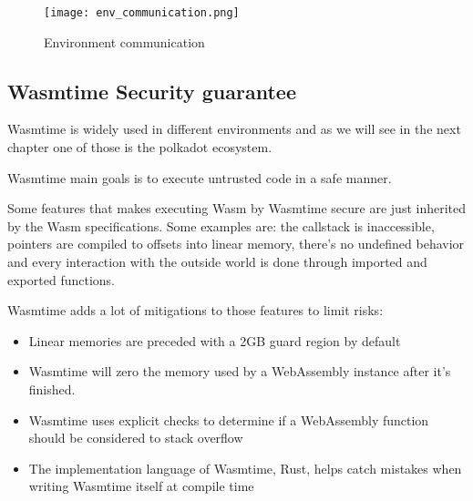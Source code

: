 \begin{figure}[h]
  \centering
  \texttt{[image: env\_communication.png]}
  \caption{Environment communication}
  \label{fig:env-communication}
\end{figure}

\subsection{Wasmtime Security guarantee}

Wasmtime is widely used in different environments and as we will see in the next chapter one of those is the polkadot ecosystem.

Wasmtime main goals is to execute untrusted code in a safe manner.~\cite{wasmtime-book}

Some features that makes executing Wasm by Wasmtime secure are just inherited by the Wasm specifications. Some examples are: the callstack is inaccessible, pointers are compiled to offsets into linear memory, there's no undefined behavior and every interaction with the outside world is done through imported and exported functions.~\cite{wasmtime-book}

Wasmtime adds  a lot of mitigations to those features to limit risks:
\begin{itemize}
  \item Linear memories are preceded with a 2GB guard region  by default
  \item Wasmtime will zero the memory used by a WebAssembly instance after it's finished.
  \item Wasmtime uses explicit checks to determine if a WebAssembly function should be considered to stack overflow
  \item The implementation language of Wasmtime, Rust, helps catch mistakes when writing Wasmtime itself at compile time
\end{itemize}
